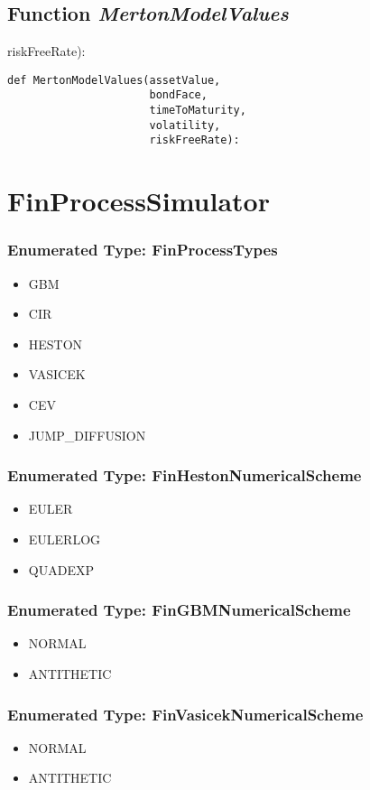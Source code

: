\documentclass[twoside,11pt]{book}
\begin{document}
\subsection{Function {\it MertonModelValues}}
riskFreeRate):

\begin{lstlisting}
def MertonModelValues(assetValue, 
                      bondFace, 
                      timeToMaturity, 
                      volatility, 
                      riskFreeRate):
\end{lstlisting}

\newpage
\section{FinProcessSimulator}

\subsubsection{Enumerated Type: FinProcessTypes}
\begin{itemize}
\item{GBM}
\item{CIR}
\item{HESTON}
\item{VASICEK}
\item{CEV}
\item{JUMP\_DIFFUSION}
\end{itemize}

\subsubsection{Enumerated Type: FinHestonNumericalScheme}
\begin{itemize}
\item{EULER}
\item{EULERLOG}
\item{QUADEXP}
\end{itemize}

\subsubsection{Enumerated Type: FinGBMNumericalScheme}
\begin{itemize}
\item{NORMAL}
\item{ANTITHETIC}
\end{itemize}

\subsubsection{Enumerated Type: FinVasicekNumericalScheme}
\begin{itemize}
\item{NORMAL}
\item{ANTITHETIC}
\end{itemize}
\end{document}
